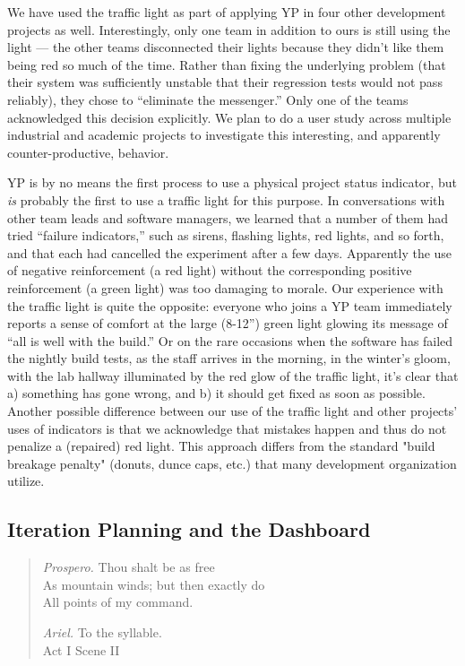 \documentclass[times, 10pt,twocolumn]{article}
\begin{document}
We have used the traffic light as part of applying YP in four
other development projects as well. Interestingly, only one team in
addition to ours is still using the light --- the other teams disconnected
their lights because they didn't like them being red so much of 
the time.  Rather
than fixing the underlying problem (that their system was sufficiently
unstable that their regression tests would not pass reliably), they chose
to ``eliminate the messenger.''  Only one of the teams acknowledged this
decision explicitly.  We plan to do a user study across multiple
industrial and academic projects to investigate this interesting, and
apparently counter-productive, behavior.

YP is by no means the first process to use a physical project status
indicator, but \emph{is} probably the first to
use a traffic light for this purpose.  In conversations with
other team leads and software managers, we learned that a number of them
had tried ``failure indicators,'' such as sirens, flashing lights, red
lights, and so forth, and that each had cancelled the experiment after a
few days.  Apparently the use of negative reinforcement (a red light)
without the corresponding positive reinforcement (a green light) was too
damaging to morale.  Our experience with the traffic light is quite the
opposite: everyone who joins a YP team immediately reports a sense of
comfort at the large (8-12'') green light glowing its message of ``all is
well with the build.''  Or on the rare occasions when the software has
failed the nightly build tests, as the staff arrives in the morning, in the
winter's gloom, with the lab hallway illuminated by the red glow of the
traffic light, it's clear that a) something has gone wrong, and b) it
should get fixed as soon as possible.  Another possible difference between
our use of the traffic light and other projects' uses of indicators is that
we acknowledge that mistakes happen and 
thus do not penalize a (repaired) red light.
This approach differs from the standard "build breakage penalty" 
(donuts, dunce caps, etc.) that many development organization utilize.

\subsection{Iteration Planning and the Dashboard}

\begin{quote}
\emph{Prospero.} 
Thou shalt be as free \\
As mountain winds; but then exactly do \\
All points of my command. 

\emph{Ariel.} To the syllable. \\
\hspace*{1cm} Act I Scene II
\end{quote}
\end{document}
